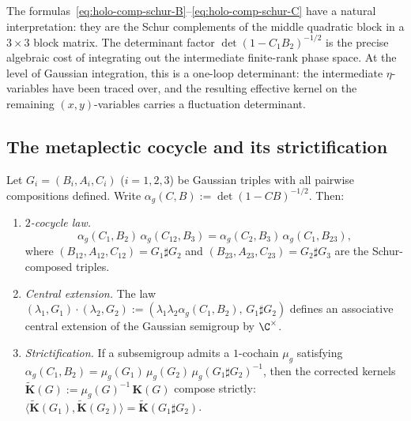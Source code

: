 \begin{remark}
\label{rem:holo-comp-schur-interpretation}
The formulas~\eqref{eq:holo-comp-schur-B}--\eqref{eq:holo-comp-schur-C}
have a natural interpretation: they are the Schur complements of the
middle quadratic block in a $3 \times 3$ block matrix. The
determinant factor $\det(1 - C_1 B_2)^{-1/2}$ is the precise
algebraic cost of integrating out the intermediate finite-rank phase
space. At the level of Gaussian integration, this is a one-loop
determinant:
the intermediate $\eta$-variables have been traced over, and the
resulting effective kernel on the remaining $(x, y)$-variables
carries a fluctuation determinant.
\end{remark}

\subsection{The metaplectic cocycle and its strictification}
\label{subsec:holo-comp-metaplectic-cocycle}

\begin{theorem}
\label{thm:holo-comp-metaplectic-cocycle}
Let $G_i = (B_i, A_i, C_i)$ ($i = 1, 2, 3$) be Gaussian triples
with all pairwise compositions defined. Write
$\alpha_g(C, B) := \det(1 - CB)^{-1/2}$. Then:
\begin{enumerate}[label=\textup{(\roman*)}]
\item \emph{$2$-cocycle law.}\;
 \begin{equation}\label{eq:holo-comp-cocycle-law}
 \alpha_g(C_1, B_2)\,\alpha_g(C_{12}, B_3)
 =
 \alpha_g(C_2, B_3)\,\alpha_g(C_1, B_{23}),
 \end{equation}
 where $(B_{12}, A_{12}, C_{12}) = G_1 \sharp G_2$ and
 $(B_{23}, A_{23}, C_{23}) = G_2 \sharp G_3$ are the Schur-composed
 triples.
\item \emph{Central extension.}\;
 The law
 $(\lambda_1, G_1) \cdot (\lambda_2, G_2)
 := (\lambda_1 \lambda_2 \alpha_g(C_1, B_2),\, G_1 \sharp G_2)$
 defines an associative central extension of the Gaussian semigroup
 by $\C^\times$.
\item \emph{Strictification.}\;
 If a subsemigroup admits a $1$-cochain $\mu_g$ satisfying
 $\alpha_g(C_1, B_2) = \mu_g(G_1)\,\mu_g(G_2)\,
 \mu_g(G_1 \sharp G_2)^{-1}$,
 then the corrected kernels
 $\widetilde{\mathbf{K}}(G) := \mu_g(G)^{-1}\,\mathbf{K}(G)$
 compose strictly:
 $\langle \widetilde{\mathbf{K}}(G_1),
 \widetilde{\mathbf{K}}(G_2) \rangle
 = \widetilde{\mathbf{K}}(G_1 \sharp G_2)$.
\end{enumerate}
\end{theorem}

